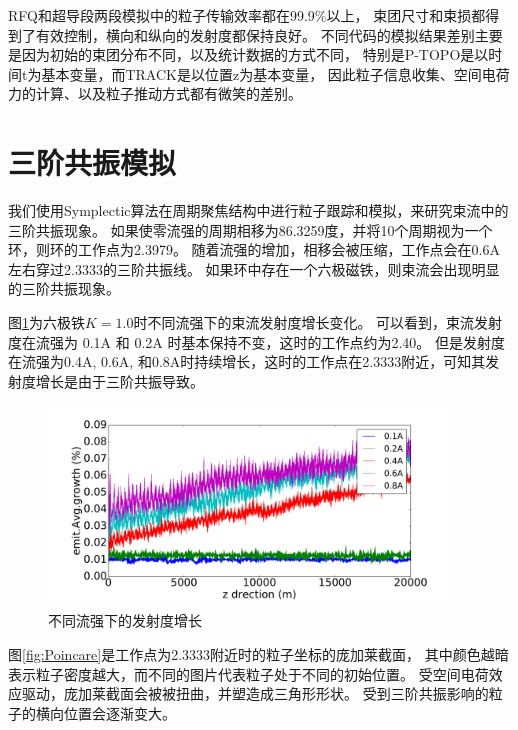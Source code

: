 RFQ和超导段两段模拟中的粒子传输效率都在99.9\%以上，
束团尺寸和束损都得到了有效控制，横向和纵向的发射度都保持良好。
不同代码的模拟结果差别主要是因为初始的束团分布不同，以及统计数据的方式不同，
特别是P-TOPO是以时间t为基本变量，而TRACK是以位置z为基本变量，
因此粒子信息收集、空间电荷力的计算、以及粒子推动方式都有微笑的差别。

\section{三阶共振模拟}            \label{section:3rd_order_simulation}
我们使用Symplectic算法在周期聚焦结构中进行粒子跟踪和模拟，来研究束流中的三阶共振现象。
如果使零流强的周期相移为86.3259度，并将10个周期视为一个环，则环的工作点为2.3979。
随着流强的增加，相移会被压缩，工作点会在0.6A左右穿过2.3333的三阶共振线。
如果环中存在一个六极磁铁，则束流会出现明显的三阶共振现象。

图\ref{fig:emitGrowthCompare}为六极铁$K=1.0$时不同流强下的束流发射度增长变化。
可以看到，束流发射度在流强为 0.1A 和 0.2A 时基本保持不变，这时的工作点约为2.40。
但是发射度在流强为0.4A, 0.6A, 和0.8A时持续增长，这时的工作点在2.3333附近，可知其发射度增长是由于三阶共振导致。

\begin{figure}[!htb]
    \centering
    \includegraphics[width=0.95\textwidth]{Img/SymplecticEmitGrowthCompare.pdf}
    \caption{不同流强下的发射度增长}
    \label{fig:emitGrowthCompare}
\end{figure}

图\ref{fig:Poincare}是工作点为2.3333附近时的粒子坐标的庞加莱截面，
其中颜色越暗表示粒子密度越大，而不同的图片代表粒子处于不同的初始位置。
受空间电荷效应驱动，庞加莱截面会被被扭曲，并塑造成三角形形状。
受到三阶共振影响的粒子的横向位置会逐渐变大。

